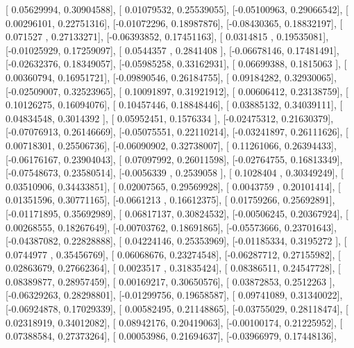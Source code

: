 \documentclass{article}
\begin{document}
       [ 0.05629994,  0.30904588],
       [ 0.01079532,  0.25539055],
       [-0.05100963,  0.29066542],
       [ 0.00296101,  0.22751316],
       [-0.01072296,  0.18987876],
       [-0.08430365,  0.18832197],
       [ 0.071527  ,  0.27133271],
       [-0.06393852,  0.17451163],
       [ 0.0314815 ,  0.19535081],
       [-0.01025929,  0.17259097],
       [ 0.0544357 ,  0.2841408 ],
       [-0.06678146,  0.17481491],
       [-0.02632376,  0.18349057],
       [-0.05985258,  0.33162931],
       [ 0.06699388,  0.1815063 ],
       [ 0.00360794,  0.16951721],
       [-0.09890546,  0.26184755],
       [ 0.09184282,  0.32930065],
       [-0.02509007,  0.32523965],
       [ 0.10091897,  0.31921912],
       [ 0.00606412,  0.23138759],
       [ 0.10126275,  0.16094076],
       [ 0.10457446,  0.18848446],
       [ 0.03885132,  0.34039111],
       [ 0.04834548,  0.3014392 ],
       [ 0.05952451,  0.1576334 ],
       [-0.02475312,  0.21630379],
       [-0.07076913,  0.26146669],
       [-0.05075551,  0.22110214],
       [-0.03241897,  0.26111626],
       [ 0.00718301,  0.25506736],
       [-0.06090902,  0.32738007],
       [ 0.11261066,  0.26394433],
       [-0.06176167,  0.23904043],
       [ 0.07097992,  0.26011598],
       [-0.02764755,  0.16813349],
       [-0.07548673,  0.23580514],
       [-0.0056339 ,  0.2539058 ],
       [ 0.1028404 ,  0.30349249],
       [ 0.03510906,  0.34433851],
       [ 0.02007565,  0.29569928],
       [ 0.0043759 ,  0.20101414],
       [ 0.01351596,  0.30771165],
       [-0.0661213 ,  0.16612375],
       [ 0.01759266,  0.25692891],
       [-0.01171895,  0.35692989],
       [ 0.06817137,  0.30824532],
       [-0.00506245,  0.20367924],
       [ 0.00268555,  0.18267649],
       [-0.00703762,  0.18691865],
       [-0.05573666,  0.23701643],
       [-0.04387082,  0.22828888],
       [ 0.04224146,  0.25353969],
       [-0.01185334,  0.3195272 ],
       [ 0.0744977 ,  0.35456769],
       [ 0.06068676,  0.23274548],
       [-0.06287712,  0.27155982],
       [ 0.02863679,  0.27662364],
       [ 0.0023517 ,  0.31835424],
       [ 0.08386511,  0.24547728],
       [ 0.08389877,  0.28957459],
       [ 0.00169217,  0.30650576],
       [ 0.03872853,  0.2512263 ],
       [-0.06329263,  0.28298801],
       [-0.01299756,  0.19658587],
       [ 0.09741089,  0.31340022],
       [-0.06924878,  0.17029339],
       [ 0.00582495,  0.21148865],
       [-0.03755029,  0.28118474],
       [ 0.02318919,  0.34012082],
       [ 0.08942176,  0.20419063],
       [-0.00100174,  0.21225952],
       [ 0.07388584,  0.27373264],
       [ 0.00053986,  0.21694637],
       [-0.03966979,  0.17448136],
\end{document}
